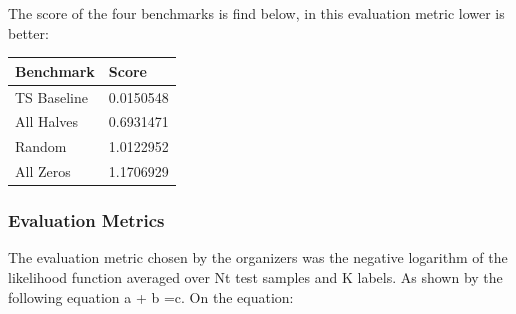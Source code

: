 \documentclass[11pt]{article}
\begin{document}
The score of the four benchmarks is find below, in this evaluation
metric lower is better:

\begin{longtable}[]{@{}ll@{}}
\toprule
Benchmark & Score\tabularnewline
\midrule
\endhead
TS Baseline & 0.0150548\tabularnewline
All Halves & 0.6931471\tabularnewline
Random & 1.0122952\tabularnewline
All Zeros & 1.1706929\tabularnewline
\bottomrule
\end{longtable}

    \hypertarget{evaluation-metrics}{%
\subsubsection{Evaluation Metrics}\label{evaluation-metrics}}

The evaluation metric chosen by the organizers was the negative
logarithm of the likelihood function averaged over Nt test samples and K
labels. As shown by the following equation a + b =c. On the equation:
\end{document}
